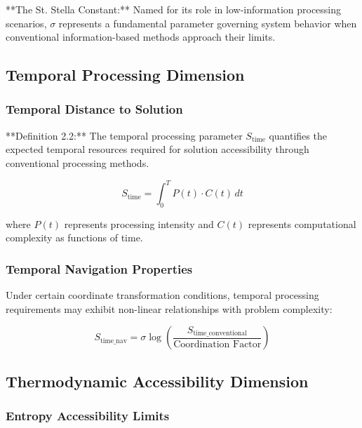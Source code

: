 \documentclass[11pt]{article}
\begin{document}
**The St. Stella Constant:** Named for its role in low-information processing scenarios, $\sigma$ represents a fundamental parameter governing system behavior when conventional information-based methods approach their limits.

\subsection{Temporal Processing Dimension}

\subsubsection{Temporal Distance to Solution}

**Definition 2.2:** The temporal processing parameter $S_{\text{time}}$ quantifies the expected temporal resources required for solution accessibility through conventional processing methods.

\begin{equation}
S_{\text{time}} = \int_0^T P(t) \cdot C(t) \, dt
\label{eq:temporal_processing}
\end{equation}

where $P(t)$ represents processing intensity and $C(t)$ represents computational complexity as functions of time.

\subsubsection{Temporal Navigation Properties}

Under certain coordinate transformation conditions, temporal processing requirements may exhibit non-linear relationships with problem complexity:

\begin{equation}
S_{\text{time\_nav}} = \sigma \log\left(\frac{S_{\text{time\_conventional}}}{\text{Coordination Factor}}\right)
\label{eq:temporal_navigation}
\end{equation}

\subsection{Thermodynamic Accessibility Dimension}

\subsubsection{Entropy Accessibility Limits}
\end{document}

